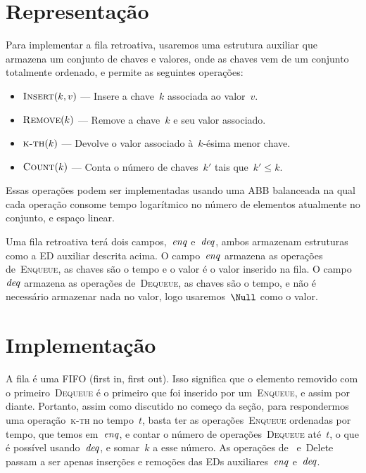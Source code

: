 \documentclass[main.tex]{subfiles}
\begin{document}
\section{Representação}

Para implementar a fila retroativa, usaremos uma estrutura auxiliar que armazena um conjunto de chaves e valores, onde as chaves vem de um conjunto totalmente ordenado, e permite as seguintes operações:

\begin{itemize}
	\item $\Call{Insert}{k, v}$ --- Insere a chave~$k$ associada ao valor~$v$.
	\item $\Call{Remove}{k}$ --- Remove a chave~$k$ e seu valor associado.
	\item $\Call{k-th}{k}$ --- Devolve o valor associado à~$k$-ésima menor chave. %
	\item $\Call{Count}{k}$ --- Conta o número de chaves~$k'$ tais que~$k' \leq k$.
\end{itemize}

Essas operações podem ser implementadas usando uma ABB balanceada na qual cada operação consome tempo logarítmico no número de elementos atualmente no conjunto, e espaço linear.

\newcommand{\deqs}{\V{deq}}
\newcommand{\enqs}{\V{enq}}

Uma fila retroativa terá dois campos,~$\enqs$ e~$\deqs$, ambos armazenam estruturas como a ED auxiliar descrita acima. O campo~$\enqs$ armazena as operações de~\textsc{Enqueue}, as chaves são o tempo e o valor é o valor inserido na fila. O campo~$\deqs$ armazena as operações de~\textsc{Dequeue}, as chaves são o tempo, e não é necessário armazenar nada no valor, logo usaremos~$\Null$ como o valor.

\section{Implementação}

A fila é uma FIFO (first in, first out). Isso significa que o elemento removido com o primeiro~\textsc{Dequeue} é o primeiro que foi inserido por um~\textsc{Enqueue}, e assim por diante. Portanto, assim como discutido no começo da seção, para respondermos uma operação~\textsc{k-th} no tempo~$t$, basta ter as operações~\textsc{Enqueue} ordenadas por tempo, que temos em~$\enqs$, e contar o número de operações~\textsc{Dequeue} até~$t$, o que é possível usando~$\deqs$, e somar~$k$ a esse número. As operações de~ e~Delete passam a ser apenas inserções e remoções das EDs auxiliares~$\enqs$ e~$\deqs$.
\end{document}
